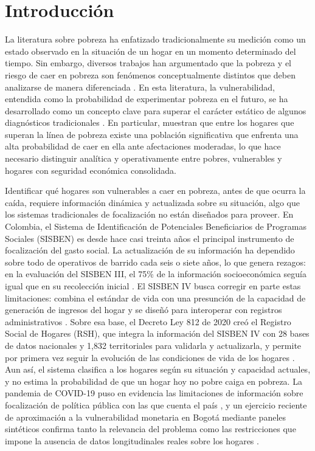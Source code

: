 \documentclass[12pt, letterpaper]{article}
\begin{document}
\section{Introducción}
\label{sec:intro}

La literatura sobre pobreza ha enfatizado tradicionalmente su medición
como un estado observado en la situación de un hogar en un momento
determinado del tiempo. Sin embargo, diversos trabajos han argumentado que la
pobreza y el riesgo de caer en pobreza son fenómenos conceptualmente
distintos que deben analizarse de manera diferenciada
\parencite{chaudhuri2002}. En esta literatura, la vulnerabilidad,
entendida como la probabilidad de experimentar pobreza en el futuro, se
ha desarrollado como un concepto clave para superar el carácter estático
de algunos diagnósticos tradicionales \parencite{fujii2016}. En
particular, \textcite{lopezCalva2011} muestran que entre los hogares que
superan la línea de pobreza existe una población significativa que
enfrenta una alta probabilidad de caer en ella ante afectaciones
moderadas, lo que hace necesario distinguir analítica y operativamente
entre pobres, vulnerables y hogares con seguridad económica consolidada.

Identificar qué hogares son vulnerables a caer en pobreza, antes de que
ocurra la caída, requiere información dinámica y actualizada sobre su
situación, algo que los sistemas tradicionales de focalización no están
diseñados para proveer. En Colombia, el Sistema de Identificación de
Potenciales Beneficiarios de Programas Sociales (SISBEN) es desde hace
casi treinta años el principal instrumento de focalización del gasto
social. La actualización de su información ha dependido sobre todo de
operativos de barrido cada seis o siete años, lo que genera rezagos: en
la evaluación del SISBEN III, el 75\% de la información socioeconómica
seguía igual que en su recolección inicial \parencite{pabon2023}. El
SISBEN IV busca corregir en parte estas limitaciones: combina el estándar
de vida con una presunción de la capacidad de generación de ingresos del
hogar y se diseñó para interoperar con registros administrativos
\parencite{conpes2016,pabon2023}. Sobre esa base, el Decreto Ley 812 de
2020 creó el Registro Social de Hogares (RSH), que integra la información
del SISBEN IV con 28 bases de datos nacionales y 1{,}832 territoriales
para validarla y actualizarla, y permite por primera vez seguir la
evolución de las condiciones de vida de los hogares \parencite{pabon2023}.
Aun así, el sistema clasifica a los hogares según su situación y
capacidad actuales, y no estima la probabilidad de que un hogar hoy no
pobre caiga en pobreza.
La pandemia
de COVID-19 puso en evidencia las limitaciones de información sobre
focalización de política pública con las que cuenta el país
\parencite{castaneda2021}, y un ejercicio reciente de aproximación a la
vulnerabilidad monetaria en Bogotá mediante paneles sintéticos confirma
tanto la relevancia del problema como las restricciones que impone la
ausencia de datos longitudinales reales sobre los hogares
\parencite{gaitan2023}.
\end{document}
